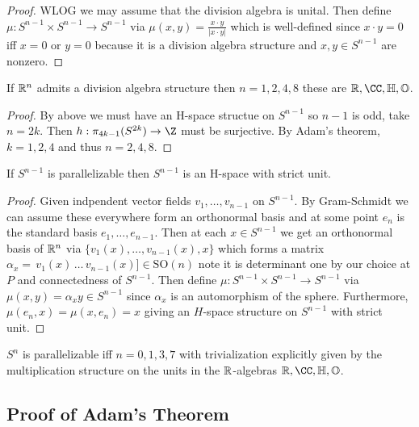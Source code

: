 \documentclass[12pt]{extarticle}
\begin{document}
\begin{proof}
WLOG we may assume that the division algebra is unital. Then define $\mu  : S^{n-1} \times S^{n-1} \to S^{n-1}$ via $\mu(x,y) = \frac{x \cdot y}{|x \cdot y|}$ which is well-defined since $x \cdot y = 0$ iff $x = 0$ or $y = 0$ because it is a division algebra structure and $x,y \in S^{n-1}$ are nonzero.
\end{proof}

\begin{corollary}
If $\mathbb{R}^n$ admits a division algebra structure then $n = 1,2,4,8$ these are $\R, \CC, \mathbb{H}, \mathbb{O}$.
\end{corollary}

\begin{proof}
By above we must have an H-space structue on $S^{n-1}$ so $n-1$ is odd, take $n = 2k$. Then $h : \pi_{4k - 1}(S^{2k}) \to \Z$ must be surjective. By Adam's theorem, $k = 1,2,4$ and thus $n = 2,4,8$. 
\end{proof}

\begin{cor}
If $S^{n-1}$ is parallelizable then $S^{n-1}$ is an H-space with strict unit.
\end{cor}

\begin{proof}
Given indpendent vector fields $v_1, \dots, v_{n-1}$ on $S^{n-1}$. By Gram-Schmidt we can assume these everywhere form an orthonormal basis and at some point $e_n$ is the standard basis $e_1, \dots, e_{n-1}$. Then at each $x \in S^{n-1}$ we get an orthonormal basis of $\mathbb{R}^n$ via $\{v_1(x), \dots, v_{n-1}(x), x \}$ which forms a matrix $\alpha_x =  \, v_1(x) \, \dots \, v_{n-1}(x)] \in \mathrm{SO}(n)$ note it is determinant one by our choice at $P$ and connectedness of $S^{n-1}$. Then define $\mu : S^{n-1} \times S^{n-1} \to S^{n-1}$ via $\mu(x,y) = \alpha_x y \in S^{n-1}$ since $\alpha_x$ is an automorphism of the sphere. Furthermore, $\mu(e_n, x) = \mu(x, e_n) = x$ giving an $H$-space structure on $S^{n-1}$ with strict unit. 
\end{proof}

\begin{cor}
$S^n$ is parallelizable iff $n = 0,1,3,7$ with trivialization explicitly given by the multiplication structure on the units in the $\mathbb{R}$-algebras $\R, \CC, \mathbb{H}, \mathbb{O}$.
\end{cor}

\subsection{Proof of Adam's Theorem}
\end{document}
